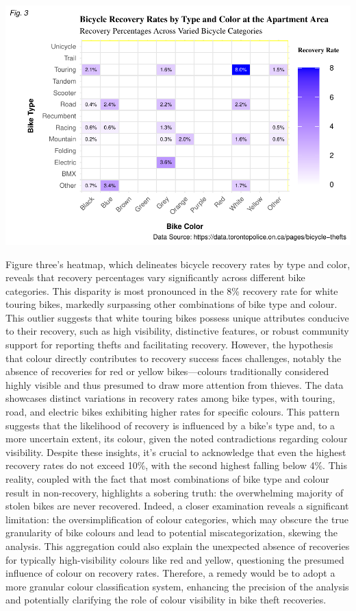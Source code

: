 \documentclass[
  11pt,
]{article}
\begin{document}
\begin{center}\includegraphics{Bike_Theft_files/figure-latex/unnamed-chunk-7-1} \end{center}

\indent Figure three's heatmap, which delineates bicycle recovery rates
by type and color, reveals that recovery percentages vary significantly
across different bike categories. This disparity is most pronounced in
the 8\% recovery rate for white touring bikes, markedly surpassing other
combinations of bike type and colour. This outlier suggests that white
touring bikes possess unique attributes conducive to their recovery,
such as high visibility, distinctive features, or robust community
support for reporting thefts and facilitating recovery. However, the
hypothesis that colour directly contributes to recovery success faces
challenges, notably the absence of recoveries for red or yellow
bikes---colours traditionally considered highly visible and thus
presumed to draw more attention from thieves. The data showcases
distinct variations in recovery rates among bike types, with touring,
road, and electric bikes exhibiting higher rates for specific colours.
This pattern suggests that the likelihood of recovery is influenced by a
bike's type and, to a more uncertain extent, its colour, given the noted
contradictions regarding colour visibility. Despite these insights, it's
crucial to acknowledge that even the highest recovery rates do not
exceed 10\%, with the second highest falling below 4\%. This reality,
coupled with the fact that most combinations of bike type and colour
result in non-recovery, highlights a sobering truth: the overwhelming
majority of stolen bikes are never recovered. Indeed, a closer
examination reveals a significant limitation: the oversimplification of
colour categories, which may obscure the true granularity of bike
colours and lead to potential miscategorization, skewing the analysis.
This aggregation could also explain the unexpected absence of recoveries
for typically high-visibility colours like red and yellow, questioning
the presumed influence of colour on recovery rates. Therefore, a remedy
would be to adopt a more granular colour classification system,
enhancing the precision of the analysis and potentially clarifying the
role of colour visibility in bike theft recoveries.
\end{document}

